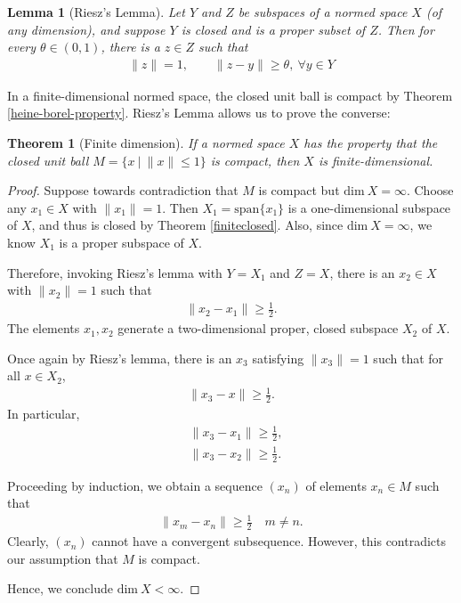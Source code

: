 \documentclass[11pt]{article}
\theoremstyle{mystyle}
\newtheorem{thm}{Theorem}[section]
\newtheorem{lm}{Lemma}[section]
\newcommand{\0}{\mathbf{0}}
\begin{document}
\begin{lm}[Riesz's Lemma]\label{rieszlemma}
Let $Y$ and $Z$ be subspaces of a normed space $X$ (of any dimension), and suppose $Y$ is closed and is a proper subset of $Z$. Then for every $\theta \in (0,1)$, there is a $z \in Z$ such that
\begin{align*}
    \|z\| = 1, \qquad \|z - y\| \geq \theta, \ \forall y \in Y
\end{align*}
\end{lm}

In a finite-dimensional normed space, the closed unit ball is compact by Theorem \ref{heine-borel-property}. Riesz's Lemma allows us to prove the converse:
\begin{thm}[Finite dimension]
If a normed space $X$ has the property that the closed unit ball $M = \{x \ | \ \|x\| \leq 1\}$ is compact, then $X$ is finite-dimensional.
\end{thm}
\begin{proof}
Suppose towards contradiction that $M$ is compact but $\text{dim}\ X = \infty$. Choose any $x_1 \in X$ with $\|x_1\| = 1$. Then $X_1 = \text{span}\{x_1\}$ is a one-dimensional subspace of $X$, and thus is closed by Theorem \ref{finiteclosed}. Also, since $\text{dim} \ X = \infty$, we know $X_1$ is a proper subspace of $X$.

Therefore, invoking Riesz's lemma with $Y = X_1$ and $Z = X$, there is an $x_2 \in X$ with $\|x_2\| = 1$ such that
\begin{align*}
    \|x_2 - x_1\| \geq \frac{1}{2}.
\end{align*}
The elements $x_1, x_2$ generate a two-dimensional proper, closed subspace $X_2$ of $X$.

Once again by Riesz's lemma, there is an $x_3$ satisfying $\|x_3\| = 1$ such that for all $x \in X_2$,
\begin{align*}
    \|x_3 - x\| \geq \frac{1}{2}.
\end{align*}
In particular,
\begin{align*}
    &\|x_3 - x_1\| \geq \frac{1}{2},\\
    &\|x_3 - x_2\| \geq \frac{1}{2}.
\end{align*}

Proceeding by induction, we obtain a sequence $(x_n)$ of elements $x_n \in M$ such that
\begin{align*}
    \|x_m - x_n\| \geq \frac{1}{2} \quad m \neq n.
\end{align*}
Clearly, $(x_n)$ cannot have a convergent subsequence. However, this contradicts our assumption that $M$ is compact.

Hence, we conclude $\text{dim} \ X < \infty$.
\end{proof}
\end{document}
